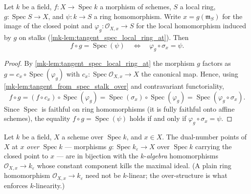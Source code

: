 \begin{lemma}\label{mk-lem:tangent_over_triangle_iff}
  \leanok

  Let \(k\) be a field, \(f : X \to \operatorname{Spec} k\) a morphism
  of schemes, \(S\) a local ring, \(g : \operatorname{Spec} S \to X\),
  and \(\psi : k \to S\) a ring homomorphism. Write
  \(x = g(\mathfrak m_S)\) for the image of the closed point and
  \(\varphi_g : \mathcal O_{X,x} \to S\) for the local homomorphism
  induced by \(g\) on stalks
  (\ref{mk-lem:tangent_spec_local_ring_at}). Then
  \[
    f \circ g = \operatorname{Spec}(\psi)
    \quad\Longleftrightarrow\quad
    \varphi_g \circ \sigma_x = \psi .
  \]
\end{lemma}

\begin{proof}
  \leanok{}
  By \ref{mk-lem:tangent_spec_local_ring_at} the morphism \(g\) factors
  as \(g = c_x \circ \operatorname{Spec}(\varphi_g)\) with
  \(c_x : \operatorname{Spec} \mathcal O_{X,x} \to X\) the canonical
  map. Hence, using \ref{mk-lem:tangent_from_spec_stalk_over} and
  contravariant functoriality,
  \[
    f \circ g
      = (f \circ c_x) \circ \operatorname{Spec}(\varphi_g)
      = \operatorname{Spec}(\sigma_x) \circ \operatorname{Spec}(\varphi_g)
      = \operatorname{Spec}(\varphi_g \circ \sigma_x).
  \]
  Since \(\operatorname{Spec}\) is faithful on ring homomorphisms (it
  is fully faithful onto affine schemes), the equality
  \(f \circ g = \operatorname{Spec}(\psi)\) holds if and only if
  \(\varphi_g \circ \sigma_x = \psi\).
\end{proof}

\begin{corollary}\label{mk-cor:tangent_over_dual_number_alghom}
  \leanok

  Let \(k\) be a field, \(X\) a scheme over \(\operatorname{Spec} k\),
  and \(x \in X\). The dual-number points of \(X\) at \(x\) \emph{over}
  \(\operatorname{Spec} k\) — morphisms
  \(g : \operatorname{Spec} k_\varepsilon \to X\) over
  \(\operatorname{Spec} k\) carrying the closed point to \(x\) — are in
  bijection with the \(k\)-\emph{algebra} homomorphisms
  \(\mathcal O_{X,x} \to k_\varepsilon\) whose constant component kills
  the maximal ideal. (A plain ring homomorphism
  \(\mathcal O_{X,x} \to k_\varepsilon\) need not be \(k\)-linear; the
  over-structure is what enforces \(k\)-linearity.)
\end{corollary}

